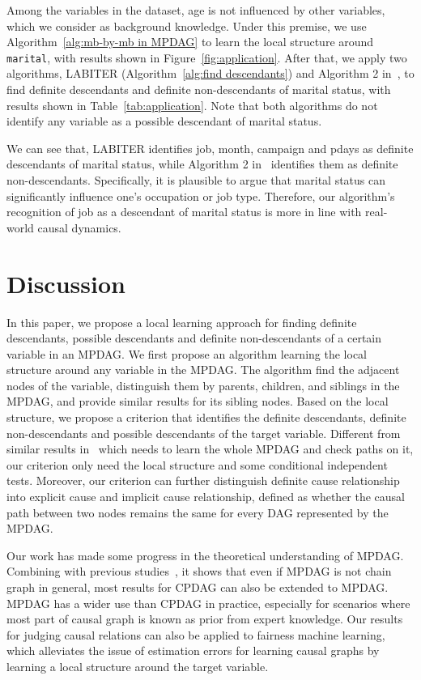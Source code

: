 \documentclass{article}
\begin{document}
Among the variables in the dataset, age is not influenced by other variables, which we consider as background knowledge. Under this premise, we use Algorithm~\ref{alg:mb-by-mb in MPDAG} to learn the local structure around \texttt{marital}, with results shown in Figure~\ref{fig:application}. After that, we apply two algorithms, LABITER (Algorithm~\ref{alg:find descendants}) and Algorithm 2 in~\citet{zuo2022counterfactual}, to find definite descendants and definite non-descendants of marital status, with results shown in Table~\ref{tab:application}. Note that both algorithms do not identify any variable as a possible descendant of marital status.

We can see that, LABITER identifies job, month, campaign and pdays as definite descendants of marital status, while Algorithm 2 in~\citet{zuo2022counterfactual} identifies them as definite non-descendants. Specifically, it is plausible to argue that marital status can significantly influence one's occupation or job type. Therefore, our algorithm's recognition of job as a descendant of marital status is more in line with real-world causal dynamics.

\section{Discussion}
\label{sec:discussion}
In this paper, we propose a local learning approach for finding definite descendants, possible descendants and definite non-descendants of a certain variable in an MPDAG. We first propose an algorithm learning the local structure around any variable in the MPDAG. The algorithm find the adjacent nodes of the variable, distinguish them by parents, children, and siblings in the MPDAG, and provide similar results for its sibling nodes. Based on the local structure, we propose a criterion that identifies the definite descendants, definite non-descendants and possible descendants of the target variable. Different from similar results in~\citep{zuo2022counterfactual} which needs to learn the whole MPDAG and check paths on it, our criterion only need the local structure and some conditional independent tests. Moreover, our criterion can further distinguish definite cause relationship into explicit cause and implicit cause relationship, defined as whether the causal path between two nodes remains the same for every DAG represented by the MPDAG.

Our work has made some progress in the theoretical understanding of MPDAG. Combining with previous studies~\citep{fang2020ida,zuo2022counterfactual}, it shows that even if MPDAG is not chain graph in general, most results for CPDAG can also be extended to MPDAG. MPDAG has a wider use than CPDAG in practice, especially for scenarios where most part of causal graph is known as prior from expert knowledge. Our results for judging causal relations can also be applied to fairness machine learning, which alleviates the issue of estimation errors for learning causal graphs by learning a local structure around the target variable.
\end{document}
